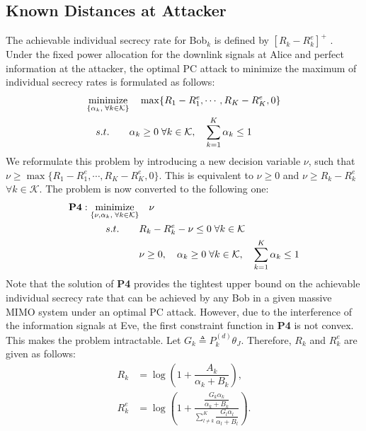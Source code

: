 \documentclass[draftclsnofoot, 12pt, onecolumn, journal]{IEEEtran}
\begin{document}
\subsection{Known Distances at Attacker}

The achievable individual secrecy rate for Bob$_k$ is defined by $[R_k - R_k^e]^+$ \cite{chen2017individual}.
Under the fixed power allocation for the downlink signals at Alice and perfect information at the attacker, the optimal PC attack to minimize the maximum of individual secrecy rates is formulated as follows:
%
\begin{align*}
\underset{ 
\begin{subarray} \\ 
\{ \alpha_k,  \; \forall k \in \mathcal{K} \}
\end{subarray} }
{\text{minimize}} 
& \quad \max \{ R_1 - R_1^e, \cdots, R_K - R_K^e, 0 \} \\
 s.t. \quad \quad & \alpha_k \geq 0  \; \forall k \in \mathcal{K}, \quad \sum_{k=1}^K \alpha_k \leq 1
\end{align*}
%
We reformulate this problem by introducing a new decision variable $\nu$, such that  $\nu \geq \max \{ R_1 - R_1^e, \cdots, R_K - R_K^e, 0 \}$.
This is equivalent to $\nu \geq 0$ and $\nu \geq R_k - R_k^e $ $\forall k \in \mathcal{K}$.
The problem is now converted to the following one:
%
\begin{align*}
\textbf{P4}:
\underset{ 
\begin{subarray} \\ 
\{ \nu, \alpha_k,  \; \forall k \in \mathcal{K} \}
\end{subarray} }
{\text{minimize}} 
& \quad \nu \\
 s.t. \quad \quad & R_k - R_k^e - \nu \leq 0 \; \forall k \in \mathcal{K} \\
& \nu \geq 0, \quad \alpha_k \geq 0  \; \forall k \in \mathcal{K}, \quad \sum_{k=1}^K \alpha_k \leq 1
\end{align*}
%
Note that the solution of \textbf{P4} provides the tightest upper bound on the achievable individual secrecy rate that can be achieved by any Bob in a given massive MIMO system under an optimal PC attack.
However, due to the interference of the information signals at Eve, the first constraint function in \textbf{P4} is not convex.
This makes the problem intractable.
Let $G_k \triangleq P_k^{(d)} \theta_J$.
Therefore, $R_k$ and $R_k^e$ are given as follows:
%
\begin{align}
R_k &= \log \left( 1 + \dfrac{A_k}{\alpha_k + B_k} \right), \\
R_k^e &= \log \left( 1 +  \frac{\dfrac{G_k \alpha_k}{\alpha_k + B_k}}{ \sum_{l \neq k}^K \dfrac{G_l \alpha_l}{\alpha_l + B_l} } \right).
\end{align}
\end{document}
